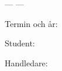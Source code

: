 
\begin{titlepage}
  \centering

  \vspace*{4cm}

  {\huge\bfseries \thesistitle \par}

  \vspace{0.8cm}

  {\Large --- \thesissubtitle{} --- \par}

  \vspace{4cm}

  {\large \classname \par}

  \vspace{1.5cm}

  {\large Termin och år: \semester \par}

  \vspace{1.5cm}

  {\large Student: \authorname \par}

  \vspace{2cm}

  {\large Handledare: \supervisor \par}

  \vfill

\end{titlepage}
